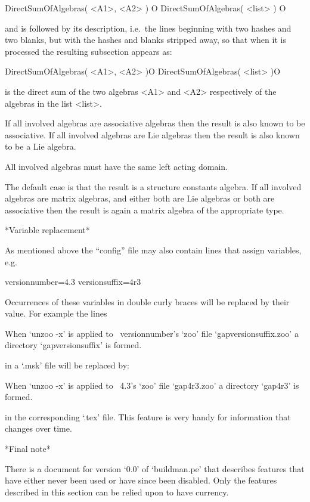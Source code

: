 \begintt
\>DirectSumOfAlgebras( <A1>, <A2> ) O
\>DirectSumOfAlgebras( <list> ) O
\endtt

and is followed by its description, i.e.~the  lines  beginning  with  two
hashes and two blanks, but with the hashes and blanks stripped  away,  so
that when it is processed the resulting subsection appears as:

\){\fmark}DirectSumOfAlgebras( <A1>, <A2> )\hfill O
\){\fmark}DirectSumOfAlgebras( <list> )\hfill O

is the direct sum of the two algebras <A1> and <A2> respectively of the
algebras in the list <list>.

If all involved algebras are associative algebras then the result is also
known to be associative.
If all involved algebras are Lie algebras then the result is also known
to be a Lie algebra.

All involved algebras must have the same left acting domain.

The default case is that the result is a structure constants algebra.
If all involved algebras are matrix algebras, and either both are Lie
algebras or both are associative then the result is again a
matrix algebra of the appropriate type.

*Variable replacement*

As mentioned above the ``config'' file may also contain lines that assign
variables, e.g.

\begintt
versionnumber=4.3
versionsuffix=4r3
\endtt

Occurrences of these variables in double curly braces will be replaced by
their value. For example the lines

\begintt
When `unzoo -x' is applied to {\GAP}~{{versionnumber}}'s `zoo' file
`gap{{versionsuffix}}.zoo' a directory `gap{{versionsuffix}}' is formed.
\endtt

in a `.msk' file will be replaced by:

\begintt
When `unzoo -x' is applied to {\GAP}~4.3's `zoo' file
`gap4r3.zoo' a directory `gap4r3' is formed.
\endtt

in the corresponding `.tex' file.
This feature is very handy for information that changes over time.

*Final note*

There is a document for version `0.0'  of  `buildman.pe'  that  describes
features that have either never been used or have  since  been  disabled.
Only the features described in this section can be relied  upon  to  have
currency.

\EndOfBook

